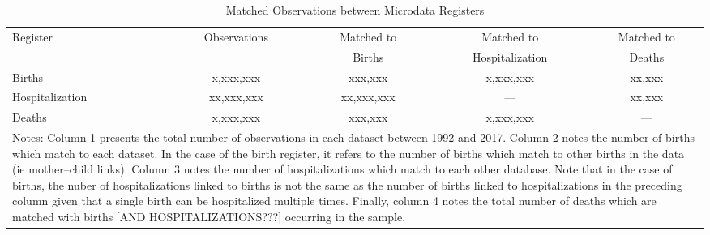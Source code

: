 \documentclass[11pt]{article}
\begin{document}
\begin{spacing}{1.5}
\begin{appendices}
  \begin{table}[htpb!]
    \centering
    \caption{Matched Observations between Microdata Registers}
    \begin{tabular}{lcccc} \toprule
      Register & Observations & Matched to & Matched to  & Matched to \\
               &              & Births     & Hospitalization & Deaths \\ \midrule
      Births          & x,xxx,xxx  & xxx,xxx    & x,xxx,xxx & xx,xxx \\
      Hospitalization & xx,xxx,xxx & xx,xxx,xxx & ---       & xx,xxx \\
      Deaths          & x,xxx,xxx  & xxx,xxx    & x,xxx,xxx & ---    \\ \midrule
      \multicolumn{5}{p{12.4cm}}{\footnotesize Notes: Column 1 presents the
        total number of observations in each dataset between 1992 and 2017.
        Column 2 notes the number of births which match to each dataset.  In the
        case of the birth register, it refers to the number of births which match
        to other births in the data (ie mother--child links). Column 3 notes the
        number of hospitalizations which match to each other database.  Note that
        in the case of births, the nuber of hospitalizations linked to births is not
        the same as the number of births linked to hospitalizations in the preceding
        column given that a single birth can be hospitalized multiple times.  Finally,
        column 4 notes the total number of deaths which are matched with births
        [AND HOSPITALIZATIONS???] occurring in the sample.}
    \end{tabular}
  \end{table}



\end{appendices}
\end{spacing}
\end{document}
